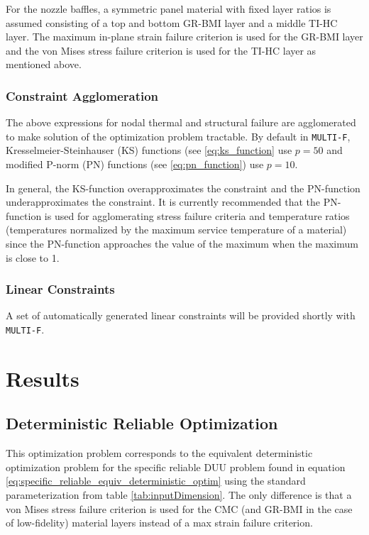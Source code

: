 \documentclass{article}
\begin{document}
For the nozzle baffles, a symmetric panel material with fixed layer ratios is assumed consisting of a top and bottom GR-BMI layer and a middle TI-HC layer. The maximum in-plane strain failure criterion is used for the GR-BMI layer and the von Mises stress failure criterion is used for the TI-HC layer as mentioned above.

\subsubsection{Constraint Agglomeration}

The above expressions for nodal thermal and structural failure are agglomerated to make solution of the optimization problem tractable. By default in \texttt{MULTI-F}, Kresselmeier-Steinhauser (KS) functions (see \ref{eq:ks_function} use $p = 50$ and modified P-norm (PN) functions (see \ref{eq:pn_function}) use $p = 10$.

In general, the KS-function overapproximates the constraint and the PN-function underapproximates the constraint. It is currently recommended that the PN-function is used for agglomerating stress failure criteria and temperature ratios (temperatures normalized by the maximum service temperature of a material) since the PN-function approaches the value of the maximum when the maximum is close to 1.

\subsubsection{Linear Constraints}

A set of automatically generated linear constraints will be provided shortly with \texttt{MULTI-F}.

\section{Results} \label{sec:results}

\subsection{Deterministic Reliable Optimization}

This optimization problem corresponds to the equivalent deterministic optimization problem for the specific reliable DUU problem found in equation \ref{eq:specific_reliable_equiv_deterministic_optim} using the standard parameterization from table \ref{tab:inputDimension}. The only difference is that a von Mises stress failure criterion is used for the CMC (and GR-BMI in the case of low-fidelity) material layers instead of a max strain failure criterion.
\end{document}
